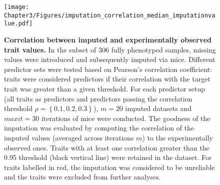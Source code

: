 \begin{figure}[hbtp]
	\centering
	\texttt{[image: Chapter3/Figures/imputation\_correlation\_median\_imputationvalue.pdf]}
	\caption[\textbf{Correlation between imputed and experimentally observed trait values.}]{\textbf{Correlation between imputed and experimentally observed trait values.} In the subset of \num{306} fully phenotyped samples, missing values were introduced and subsequently imputed via \gls{mice}. Different predictor sets were tested based on Pearson's correlation coefficient: traits were considered predictors if their correlation with the target trait was greater than a given threshold. For each predictor setup (all traits as predictors and predictors passing the correlation threshold \(\rho =\left\{0.1, 0.2, 0.3\right\}\)), \(m=20\) imputed datasets and \(maxit=30\) iterations of \gls{mice} were conducted. The goodness of the imputation was evaluated by computing the correlation of the imputed values (averaged across iterations \(m\)) to the experimentally observed ones. Traits with at least one correlation greater than the \num{0.95} threshold (black vertical line) were retained in the dataset. For traits labelled in red, the imputation was considered to be unreliable and the traits were excluded from further analyses.}
 	\label{fig:mice}
\end{figure}


